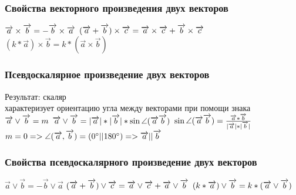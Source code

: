 \documentclass{article}
\begin{document}
\subsubsection{Свойства векторного произведения двух векторов}
$\overrightarrow{a}\times\overrightarrow{b}=-\overrightarrow{b}\times\overrightarrow{a}\\$
$(\overrightarrow{a}+\overrightarrow{b})\times\overrightarrow{c}=\overrightarrow{a}\times\overrightarrow{c}+\overrightarrow{b}\times\overrightarrow{c}\\$
$(k*\overrightarrow{a})\times\overrightarrow{b}=k*(\overrightarrow{a}\times\overrightarrow{b})$
\subsubsection{Псевдоскалярное произведение двух векторов}
Результат: скаляр\\
характеризует ориентацию угла между векторами при помощи знака\\
$\overrightarrow{a}\vee\overrightarrow{b}=m\\$
$\overrightarrow{a}\vee\overrightarrow{b}=|\overrightarrow{a}|*|\overrightarrow{b}|*\sin\angle(\overrightarrow{a}\overrightarrow{b})\\$
$\sin\angle(\overrightarrow{a}\overrightarrow{b})=\frac{\overrightarrow{a}*\overrightarrow{b}}{|\overrightarrow{a}|*|\overrightarrow{b}|}\\$
$m=0 => \angle(\overrightarrow{a},\overrightarrow{b})=(0^\circ||180^\circ) => \overrightarrow{a}||\overrightarrow{b}\\$
\subsubsection{Свойства псевдоскалярного произведение двух векторов}
$\overrightarrow{a}\vee\overrightarrow{b}=-\overrightarrow{b}\vee\overrightarrow{a}$
$(\overrightarrow{a}+\overrightarrow{b})\vee\overrightarrow{c}=\overrightarrow{a}\vee\overrightarrow{c}+\overrightarrow{a}\vee\overrightarrow{b}\\$
$(k*\overrightarrow{a})\vee\overrightarrow{b}=k*(\overrightarrow{a}\vee\overrightarrow{b})\\$
\end{document}
